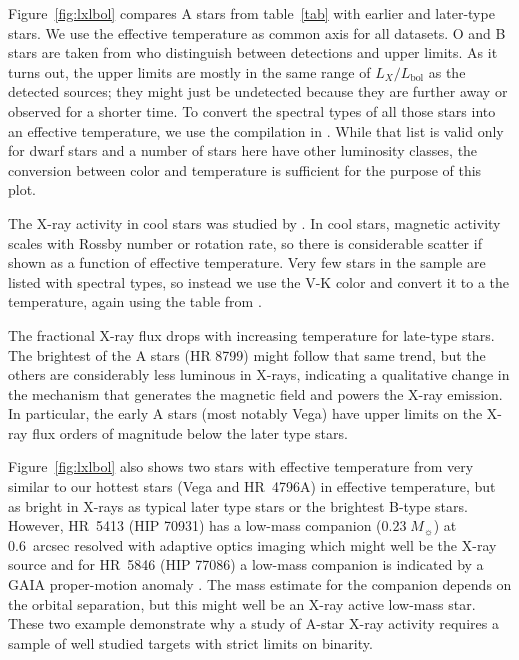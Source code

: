 \documentclass[preprint2]{aastex631}
\begin{document}
Figure~\ref{fig:lxlbol} compares A stars from table~\ref{tab} with earlier and later-type stars. We use the effective temperature as common axis for all datasets. 
O and B stars are taken from \citet{1996A&AS..118..481B} who distinguish between detections and upper limits. As it turns out, the upper limits are mostly in the same range of $L_X/L_\mathrm{bol}$ as the detected sources; they might just be undetected because they are further away or observed for a shorter time. To convert the spectral types of all those stars into an effective temperature, we use the compilation in \citet{2013ApJS..208....9P}. While that list is valid only for dwarf stars and a number of stars here have other luminosity classes, the conversion between color and temperature is sufficient for the purpose of this plot.

The X-ray activity in cool stars was studied by \citet{2011ApJ...743...48W}. In cool stars, magnetic activity scales with Rossby number or rotation rate, so there is considerable scatter if shown as a function of effective temperature. Very few stars in the sample are listed with spectral types, so instead we use the V-K color and convert it to a the temperature, again using the table from \citet{2013ApJS..208....9P}.

The fractional X-ray flux drops with increasing temperature for late-type stars. The brightest of the A stars (HR 8799) might follow that same trend, but the others are considerably less luminous in X-rays, indicating a qualitative change in the mechanism that generates the magnetic field and powers the X-ray emission. In particular, the early A stars (most notably Vega) have upper limits on the X-ray flux orders of magnitude below the later type stars. 

Figure~\ref{fig:lxlbol} also shows two stars with effective temperature from \citet{1996A&AS..118..481B} very similar to our hottest stars (Vega and HR~4796A) in effective temperature, but as bright in X-rays as typical later type stars or the brightest B-type stars. However, HR~5413 (HIP 70931) has a low-mass companion ($0.23\;M_\sun$) at 0.6~arcsec resolved with adaptive optics imaging \citep{2014MNRAS.437.1216D} which might well be the X-ray source and for HR~5846 (HIP 77086) a low-mass companion is indicated by a GAIA proper-motion anomaly \citep{2019A&A...623A..72K}. The mass estimate for the companion depends on the orbital separation, but this might well be an X-ray active low-mass star. These two example demonstrate why a study of A-star X-ray activity requires a sample of well studied targets with strict limits on binarity.
\end{document}
